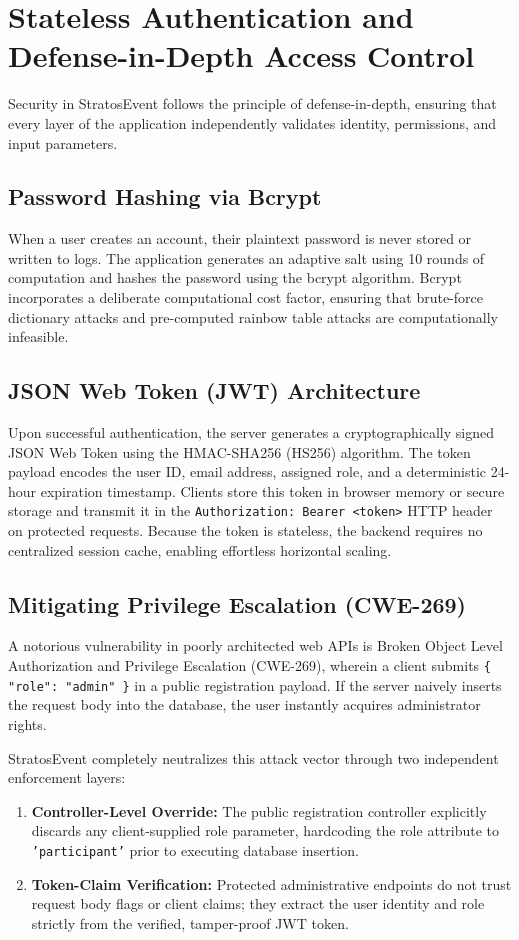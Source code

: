 \documentclass[11pt,a4paper]{report}
\begin{document}
\section{Stateless Authentication and Defense-in-Depth Access Control}
\justifying
Security in StratosEvent follows the principle of defense-in-depth, ensuring that every layer of the application independently validates identity, permissions, and input parameters.

\subsection{Password Hashing via Bcrypt}
When a user creates an account, their plaintext password is never stored or written to logs. The application generates an adaptive salt using 10 rounds of computation and hashes the password using the bcrypt algorithm. Bcrypt incorporates a deliberate computational cost factor, ensuring that brute-force dictionary attacks and pre-computed rainbow table attacks are computationally infeasible.

\subsection{JSON Web Token (JWT) Architecture}
Upon successful authentication, the server generates a cryptographically signed JSON Web Token using the HMAC-SHA256 (HS256) algorithm. The token payload encodes the user ID, email address, assigned role, and a deterministic 24-hour expiration timestamp. Clients store this token in browser memory or secure storage and transmit it in the \texttt{Authorization: Bearer <token>} HTTP header on protected requests. Because the token is stateless, the backend requires no centralized session cache, enabling effortless horizontal scaling.

\subsection{Mitigating Privilege Escalation (CWE-269)}
A notorious vulnerability in poorly architected web APIs is Broken Object Level Authorization and Privilege Escalation (CWE-269), wherein a client submits \texttt{\{ "role": "admin" \}} in a public registration payload. If the server naively inserts the request body into the database, the user instantly acquires administrator rights.

StratosEvent completely neutralizes this attack vector through two independent enforcement layers:
\begin{enumerate}[leftmargin=1.5em, itemsep=0.3em]
    \item \textbf{Controller-Level Override:} The public registration controller explicitly discards any client-supplied role parameter, hardcoding the role attribute to \texttt{'participant'} prior to executing database insertion.
    \item \textbf{Token-Claim Verification:} Protected administrative endpoints do not trust request body flags or client claims; they extract the user identity and role strictly from the verified, tamper-proof JWT token.
\end{enumerate}
\end{document}
